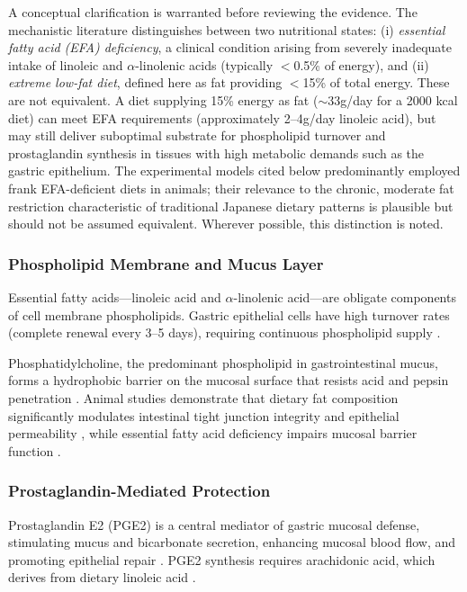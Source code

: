 \documentclass[review]{elsarticle}
\begin{document}
A conceptual clarification is warranted before reviewing the evidence. The mechanistic literature distinguishes between two nutritional states: (i) \textit{essential fatty acid (EFA) deficiency}, a clinical condition arising from severely inadequate intake of linoleic and $\alpha$-linolenic acids (typically $<$0.5\% of energy), and (ii) \textit{extreme low-fat diet}, defined here as fat providing $<$15\% of total energy. These are not equivalent. A diet supplying 15\% energy as fat ($\sim$33g/day for a 2000 kcal diet) can meet EFA requirements (approximately 2--4g/day linoleic acid), but may still deliver suboptimal substrate for phospholipid turnover and prostaglandin synthesis in tissues with high metabolic demands such as the gastric epithelium. The experimental models cited below predominantly employed frank EFA-deficient diets in animals; their relevance to the chronic, moderate fat restriction characteristic of traditional Japanese dietary patterns is plausible but should not be assumed equivalent. Wherever possible, this distinction is noted.

\subsubsection{Phospholipid Membrane and Mucus Layer}

Essential fatty acids---linoleic acid and $\alpha$-linolenic acid---are obligate components of cell membrane phospholipids. Gastric epithelial cells have high turnover rates (complete renewal every 3--5 days), requiring continuous phospholipid supply \cite{papadia2012}.

Phosphatidylcholine, the predominant phospholipid in gastrointestinal mucus, forms a hydrophobic barrier on the mucosal surface that resists acid and pepsin penetration \cite{hills1983,lichtenberger1995}. Animal studies demonstrate that dietary fat composition significantly modulates intestinal tight junction integrity and epithelial permeability \cite{kirpich2012}, while essential fatty acid deficiency impairs mucosal barrier function \cite{hollander1991}.

\subsubsection{Prostaglandin-Mediated Protection}

Prostaglandin E2 (PGE2) is a central mediator of gastric mucosal defense, stimulating mucus and bicarbonate secretion, enhancing mucosal blood flow, and promoting epithelial repair \cite{wallace2008}. PGE2 synthesis requires arachidonic acid, which derives from dietary linoleic acid \cite{calder2015}.
\end{document}
